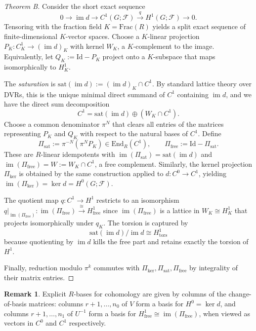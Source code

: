 \documentclass[11pt]{amsart}
\theoremstyle{plain}
\theoremstyle{definition}
\newtheorem{remark}[theorem]{Remark}
\newcommand{\Ring}{R}                          %
\newcommand{\unif}{\pi}                        %
\newcommand{\sheaf}[1]{\mathcal{#1}}                  %
\newcommand{\sat}{\mathrm{sat}}
\newcommand{\free}{\mathrm{free}}
\newcommand{\tors}{\mathrm{tors}}
\newcommand{\coboundary}{d}                           %
\DeclareMathOperator{\im}{im}                         %
\begin{document}
\begin{proof} [Theorem B]
Consider the short exact sequence
\[
0 \to \im \coboundary \to C^1(G;\sheaf{F}) \xrightarrow{q} H^1(G;\sheaf{F}) \to 0.
\]
Tensoring with the fraction field $K = \mathrm{Frac}(\Ring)$ yields a split exact sequence of finite-dimensional $K$-vector spaces. Choose a $K$-linear projection $P_K: C^1_K \to (\im \coboundary)_K$ with kernel $W_K$, a $K$-complement to the image. Equivalently, let $Q_K := \mathrm{Id} - P_K$ project onto a $K$-subspace that maps isomorphically to $H^1_K$.

The \emph{saturation} is $\sat(\im \coboundary) := (\im \coboundary)_K \cap C^1$. By standard lattice theory over DVRs, this is the unique minimal direct summand of $C^1$ containing $\im \coboundary$, and we have the direct sum decomposition
\[
C^1 = \sat(\im \coboundary) \oplus (W_K \cap C^1).
\]
Choose a common denominator $\unif^N$ that clears all entries of the matrices representing $P_K$ and $Q_K$ with respect to the natural bases of $C^1$. Define
\[
\Pi_{\sat} := \unif^{-N}(\unif^N P_K) \in \mathrm{End}_\Ring(C^1), \qquad \Pi_{\free} := \mathrm{Id} - \Pi_{\sat}.
\]
These are $\Ring$-linear idempotents with $\im(\Pi_{\sat}) = \sat(\im \coboundary)$ and $\im(\Pi_{\free}) = W := W_K \cap C^1$, a free complement. Similarly, the kernel projection $\Pi_{\ker}$ is obtained by the same construction applied to $\coboundary: C^0 \to C^1$, yielding $\im(\Pi_{\ker}) = \ker \coboundary = H^0(G;\sheaf{F})$.

The quotient map $q: C^1 \to H^1$ restricts to an isomorphism $q|_{\im(\Pi_{\free})}: \im(\Pi_{\free}) \xrightarrow{\cong} H^1_{\free}$ since $\im(\Pi_{\free})$ is a lattice in $W_K \cong H^1_K$ that projects isomorphically under $q_K$. The torsion is captured by
\[
\sat(\im \coboundary)/\im \coboundary \cong H^1_{\tors}
\]
because quotienting by $\im \coboundary$ kills the free part and retains exactly the torsion of $H^1$.

Finally, reduction modulo $\unif^k$ commutes with $\Pi_{\ker}, \Pi_{\sat}, \Pi_{\free}$ by integrality of their matrix entries.
\end{proof}

\begin{remark}
Explicit $\Ring$-bases for cohomology are given by columns of the change-of-basis 
matrices: columns $r+1, \ldots, n_0$ of $V$ form a basis for $H^0 = \ker \coboundary$, 
and columns $r+1, \ldots, n_1$ of $U^{-1}$ form a basis for $H^1_{\free} \cong 
\im(\Pi_{\free})$, when viewed as vectors in $C^0$ and $C^1$ respectively.
\end{remark}
\end{document}
